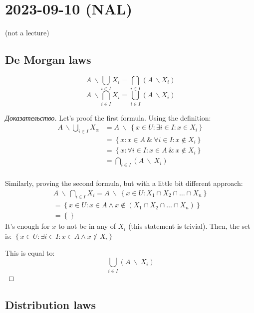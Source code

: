 \section{2023-09-10 (NAL)}

(not a lecture)

\subsection{De Morgan laws}

\begin{proposition}
	\[
		A \ \backslash \bigcup_{i \in I} X_{i} = \bigcap_{i \in  I} (A \ \backslash X_{i}) 
	\]
	\[
		A \ \backslash \bigcap_{i \in I} X_{i} = \bigcup_{i \in  I} (A \ \backslash X_{i}) 
	\]
\end{proposition}

\begin{proof}[Доказательство]
	Let's proof the first formula. Using the definition: 
	\begin{align*}
		A \ \backslash \bigcup_{i \in I} X_{\alpha} &= A \ \backslash \  \left\{x \in U: \exists i \in I : x \in X_{i}  \right \}  \\
		&= \left\{ x : x \in A \ \& \ \forall i \in I : x \notin X_{i} \right \}  \\	
		&= \left\{ x : \forall i \in I: x \in A \ \& \ x \notin X_{i} \right \}  \\
		&= \bigcap_{i \in I} \left( A \ \backslash \  X_{i} \right)   \\
	\end{align*}

	Similarly, proving the second formula, but with a little bit different approach:
	\begin{align*}
		A \ \backslash \  \bigcap_{i \in  I} X_{i} = A \ \backslash \  \left\{ x \in U: X_1 \cap X_2 \cap \dots \cap X_n \right \} \\
		= \left\{ x \in U: x \in A \wedge x \notin (X_1 \cap X_2 \cap \dots \cap X_n) \right \} \\
		= \left\{  \right \} 
	\end{align*}
	It's enough for $x$ to not be in any of $X_i$ (this statement is trivial). Then, the set is: $\left\{ x \in U: \exists i \in I: x \in A \wedge x \notin X_i \right \} $  

	This is equal to: \[
		\bigcup_{i \in  I} \left( A \ \backslash \  X_{i} \right) 
	\]
\end{proof}

\subsection{Distribution laws}

